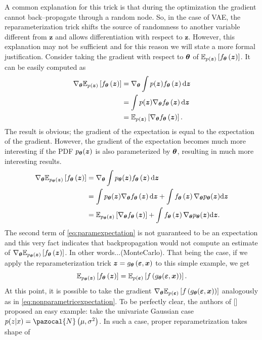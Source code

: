 A common explanation for this trick is that during the optimization the gradient cannot back--propagate through a random node. So, in the case of VAE, the reparameterization trick shifts the source of randomness to another variable different from $\boldsymbol{z}$ and allows differentiation with respect to $\boldsymbol{z}$. However, this explanation may not be sufficient and for this reason we will state a more formal justification. Consider taking the gradient with respect to $\boldsymbol{\theta}$ of $\mathbb{E}_{p(\boldsymbol{z})}\left[f_{\boldsymbol{\theta}}\left(\boldsymbol{z}\right) \right]$. It can be easily computed as
\begin{align}
    \nabla_{\boldsymbol{\theta}}  \mathbb{E}_{p(\boldsymbol{z})}\left[f_{\boldsymbol{\theta}}\left(\boldsymbol{z}\right) \right] &= \nabla_{\boldsymbol{\theta}} \int p(\boldsymbol{z}) f_{\boldsymbol{\theta}}\left(\boldsymbol{z}\right) \mathrm{d}{\boldsymbol{z}} \\
    &= \int p(\boldsymbol{z}) \nabla_{\boldsymbol{\theta}} f_{\boldsymbol{\theta}}\left(\boldsymbol{z}\right) \mathrm{d}{\boldsymbol{z}} \\
    &=  \mathbb{E}_{p(\boldsymbol{z})}\left[\nabla_{\boldsymbol{\theta}}f_{\boldsymbol{\theta}}\left(\boldsymbol{z}\right) \right].\label{eq:nonparametricexpectation}
\end{align}
The result is obvious; the gradient of the expectation is equal to the expectation of the gradient. However, the gradient of the expectation becomes much more interesting if the PDF $p_{\boldsymbol{\theta}}(\boldsymbol{z})$ is also parameterized by $\boldsymbol{\theta}$, resulting in much more interesting results.
\begin{align}
    \nabla_{\boldsymbol{\theta}}  \mathbb{E}_{p_{\boldsymbol{\theta}}(\boldsymbol{z})}\left[f_{\boldsymbol{\theta}}\left(\boldsymbol{z}\right) \right] &= \nabla_{\boldsymbol{\theta}} \int p_{\boldsymbol{\theta}}(\boldsymbol{z}) f_{\boldsymbol{\theta}}\left(\boldsymbol{z}\right) \mathrm{d}{\boldsymbol{z}} \\
    &= \int p_{\boldsymbol{\theta}}(\boldsymbol{z}) \nabla_{\boldsymbol{\theta}} f_{\boldsymbol{\theta}}\left(\boldsymbol{z}\right) \mathrm{d}{\boldsymbol{z}} + \int  f_{\boldsymbol{\theta}}\left(\boldsymbol{z}\right) \nabla_{\boldsymbol{\theta}}p_{\boldsymbol{\theta}}(\boldsymbol{z})\mathrm{d}{\boldsymbol{z}} \\
    &=  \mathbb{E}_{p_{\boldsymbol{\theta}}(\boldsymbol{z})}\left[\nabla_{\boldsymbol{\theta}}f_{\boldsymbol{\theta}}\left(\boldsymbol{z}\right) \right] + \int  f_{\boldsymbol{\theta}}\left(\boldsymbol{z}\right) \nabla_{\boldsymbol{\theta}}p_{\boldsymbol{\theta}}(\boldsymbol{z})\mathrm{d}{\boldsymbol{z}}. \label{eq:paramexpectation}
\end{align}
The second term of \eqref{eq:paramexpectation} is not guaranteed to be an expectation and this very fact indicates that backpropagation would not compute an estimate of $\nabla_{\boldsymbol{\theta}}  \mathbb{E}_{p_{\boldsymbol{\theta}}(\boldsymbol{z})}\left[f_{\boldsymbol{\theta}}\left(\boldsymbol{z}\right) \right]$. In other words...(MonteCarlo). That being the case, if we apply the reparameterization trick $\boldsymbol{z} =g_{\boldsymbol{\theta}}\left(\boldsymbol{\varepsilon},\boldsymbol{x}\right)$ to this simple example, we get
\begin{equation}
\mathbb{E}_{p_{\boldsymbol{\theta}}(\boldsymbol{z})}\left[f_{\boldsymbol{\theta}}\left(\boldsymbol{z}\right) \right] = \mathbb{E}_{p(\boldsymbol{\varepsilon})}\left[f\left(g_{\boldsymbol{\theta}}(\boldsymbol{\varepsilon}, \boldsymbol{x})\right) \right].
\end{equation}
At this point, it is possible to take the gradient $\nabla_{\boldsymbol{\theta}} \mathbb{E}_{p(\boldsymbol{\varepsilon})}\left[f\left(g_{\boldsymbol{\theta}}(\boldsymbol{\varepsilon}, \boldsymbol{x})\right) \right]$ analogously as in \eqref{eq:nonparametricexpectation}. To be perfectly clear, the authors of [] proposed an easy example: take the univariate Gaussian case $p(z|x) = \pazocal{N}\left(\mu, \sigma^2\right)$. In such a case, proper reparametrization takes shape of
